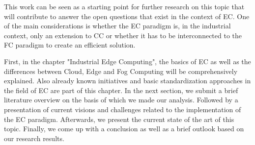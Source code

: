 This work can be seen as a starting point for further research on this topic that will contribute to answer the open questions that exist in the context of EC. One of the main considerations is whether the EC paradigm is, in the industrial context, only an extension to CC or whether it has to be interconnected to the FC paradigm to create an efficient solution.\par
First, in the chapter "Industrial Edge Computing", the basics of EC as well as the differences between Cloud, Edge and Fog Computing will be comprehensively explained. Also already known initiatives and basic standardization approaches in the field of EC are part of this chapter. In the next section, we submit a brief literature overview on the basis of which we made our analysis. Followed by a presentation of current visions and challenges related to the implementation of the EC paradigm. Afterwards, we present the current state of the art of this topic. Finally, we come up with a conclusion as well as a brief outlook based on our research results.\par